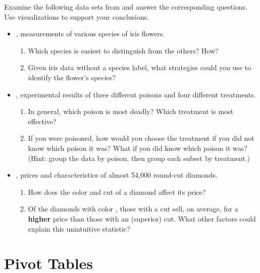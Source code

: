 \begin{problem} %
Examine the following data sets from  and answer the corresponding questions.
Use visualizations to support your conclusions.

\begin{itemize}
    \item {}, measurements of various species of iris flowers.
    \begin{enumerate}
        \item Which species is easiest to distinguish from the others? How?
        \item Given iris data without a species label, what strategies could you use to identify the flower's species?
    \end{enumerate}
    \item {}, experimental results of three different poisons and four different treatments.
    \begin{enumerate}
        \item In general, which poison is most deadly?
        Which treatment is most effective?
        \item If you were poisoned, how would you choose the treatment if you did not know which poison it was? What if you did know which poison it was?
        \\(Hint: group the data by poison, then group each subset by treatment.)
    \end{enumerate}
    \item {}, prices and characteristics of almost 54,000 round-cut diamonds.
    \begin{enumerate}
        \item How does the color and cut of a diamond affect its price?
        \item Of the diamonds with color , those with a  cut sell, on average, for a \textbf{higher} price than those with an  (superior) cut.
        What other factors could explain this unintuitive statistic?
    \end{enumerate}
\end{itemize}
\end{problem}

\section*{Pivot Tables} %

